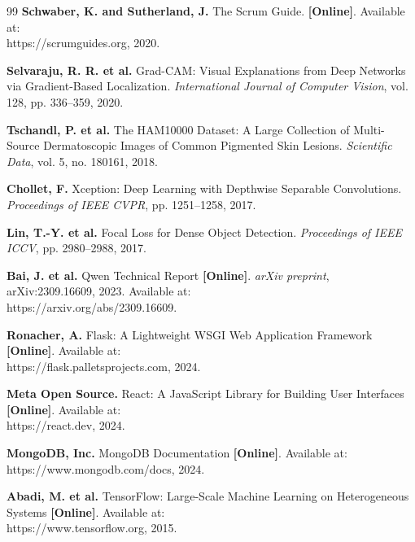 \begin{thebibliography}{99}
\textbf{Schwaber, K. and Sutherland, J.} The Scrum Guide. \textbf{[Online]}.
Available at:\\
https://scrumguides.org, 2020.


\textbf{Selvaraju, R. R. et al.} Grad-CAM: Visual Explanations from Deep Networks
via Gradient-Based Localization.
\textit{International Journal of Computer Vision}, vol. 128, pp. 336--359, 2020.

\textbf{Tschandl, P. et al.} The HAM10000 Dataset: A Large Collection of
Multi-Source Dermatoscopic Images of Common Pigmented Skin Lesions.
\textit{Scientific Data}, vol. 5, no. 180161, 2018.

\textbf{Chollet, F.} Xception: Deep Learning with Depthwise Separable Convolutions.
\textit{Proceedings of IEEE CVPR}, pp. 1251--1258, 2017.

\textbf{Lin, T.-Y. et al.} Focal Loss for Dense Object Detection.
\textit{Proceedings of IEEE ICCV}, pp. 2980--2988, 2017.

\textbf{Bai, J. et al.} Qwen Technical Report \textbf{[Online]}.
\textit{arXiv preprint}, arXiv:2309.16609, 2023.
Available at:\\
https://arxiv.org/abs/2309.16609.


\textbf{Ronacher, A.} Flask: A Lightweight WSGI Web Application Framework
\textbf{[Online]}.
Available at:\\
https://flask.palletsprojects.com, 2024.

\textbf{Meta Open Source.} React: A JavaScript Library for Building User Interfaces
\textbf{[Online]}.
Available at:\\
https://react.dev, 2024.

\textbf{MongoDB, Inc.} MongoDB Documentation \textbf{[Online]}.
Available at:\\
https://www.mongodb.com/docs, 2024.

\textbf{Abadi, M. et al.} TensorFlow: Large-Scale Machine Learning on Heterogeneous
Systems \textbf{[Online]}.
Available at:\\
https://www.tensorflow.org, 2015.


\end{thebibliography}
